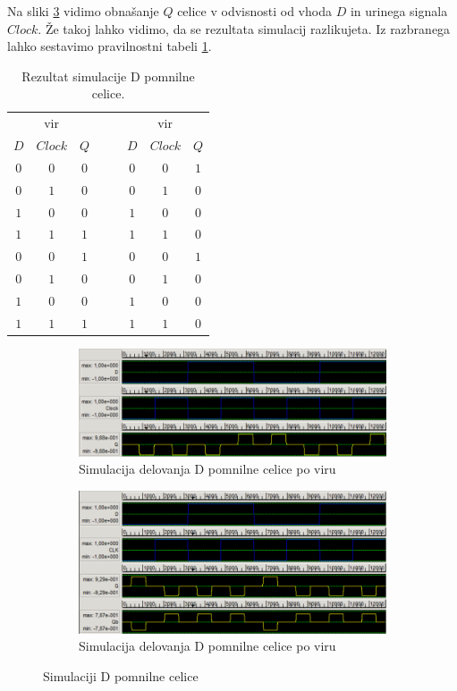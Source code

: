 \documentclass[a4paper, 11pt]{article}
\begin{document}
Na sliki \ref{fig-d-sim} vidimo obnašanje $Q$ celice v odvisnosti od vhoda $D$ in urinega signala $Clock$. Že takoj lahko vidimo, da se rezultata simulacij razlikujeta. Iz razbranega lahko sestavimo pravilnostni tabeli \ref{tab-d-sim}.
\begin{table}[h!]
	\centering
	\small
	\begin{tabular}{cc|cccc|c}
	\multicolumn{3}{c}{vir \cite{quantum_dot}} & $\quad$ & \multicolumn{3}{c}{vir \cite{a_novel_approach}}\\
	$D$ & $Clock$ & $Q$ && $D$ & $Clock$ & $Q$ \\
	\cline{1-3} \cline{5-7}
	$0$ & $0$ & $0$ && $0$ & $0$ & $1$\\
	$0$ & $1$ & $0$ && $0$ & $1$ & $0$\\
	$1$ & $0$ & $0$ && $1$ & $0$ & $0$\\
	$1$ & $1$ & $1$ && $1$ & $1$ & $0$\\
	\cline{1-3} \cline{5-7}
	$0$ & $0$ & $1$ && $0$ & $0$ & $1$\\
	$0$ & $1$ & $0$ && $0$ & $1$ & $0$\\
	$1$ & $0$ & $0$ && $1$ & $0$ & $0$\\
	$1$ & $1$ & $1$ && $1$ & $1$ & $0$\\
	\end{tabular}
	\caption{Rezultat simulacije D pomnilne celice.}
	\label{tab-d-sim}
\end{table}


\begin{figure}[h!]
	\begin{subfigure}[b]{\textwidth}
	\includegraphics[width=\textwidth]{../img/vir_4/sim_d.png}
	\caption{Simulacija delovanja D pomnilne celice po viru \cite{quantum_dot}}
	\label{fig-d-1-sim}
	\end{subfigure}
	\begin{subfigure}[b]{\textwidth}
	\includegraphics[width=\textwidth]{../img/vir_5/sim_d.png}
	\caption{Simulacija delovanja D pomnilne celice po viru \cite{a_novel_approach}}
	\label{fig-d-2-sim}
	\end{subfigure}
	\caption{Simulaciji D pomnilne celice}
	\label{fig-d-sim}
\end{figure}
\end{document}

